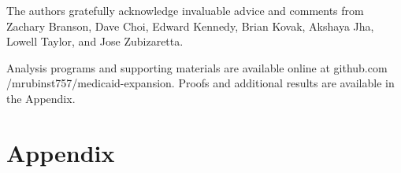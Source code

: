 \documentclass[aoas]{imsart}
\theoremstyle{plain}
\theoremstyle{remark}
\begin{document}
The authors gratefully acknowledge invaluable advice and comments from Zachary Branson, Dave Choi, Edward Kennedy, Brian Kovak, Akshaya Jha, Lowell Taylor, and Jose Zubizaretta.

\begin{supplement}
Analysis programs and supporting materials are available online at github.com /mrubinst757/medicaid-expansion. Proofs and additional results are available in the Appendix.
\end{supplement}


\clearpage

\appendix










\section{Appendix}



\end{document}
